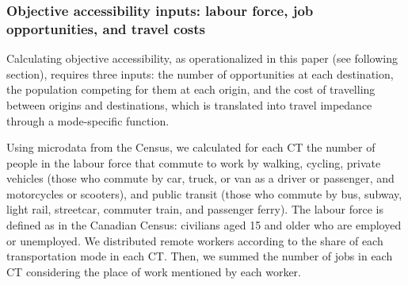 \documentclass[preprint, 3p,
authoryear]{elsarticle} %
\begin{document}
\subsubsection{Objective accessibility inputs: labour force, job
opportunities, and travel
costs}\label{objective-accessibility-inputs-labour-force-job-opportunities-and-travel-costs}

Calculating objective accessibility, as operationalized in this paper
(see following section), requires three inputs: the number of
opportunities at each destination, the population competing for them at
each origin, and the cost of travelling between origins and
destinations, which is translated into travel impedance through a
mode-specific function.

Using microdata from the Census, we calculated for each CT the number of
people in the labour force that commute to work by walking, cycling,
private vehicles (those who commute by car, truck, or van as a driver or
passenger, and motorcycles or scooters), and public transit (those who
commute by bus, subway, light rail, streetcar, commuter train, and
passenger ferry). The labour force is defined as in the Canadian Census:
civilians aged 15 and older who are employed or unemployed. We
distributed remote workers according to the share of each transportation
mode in each CT. Then, we summed the number of jobs in each CT
considering the place of work mentioned by each worker.
\end{document}
